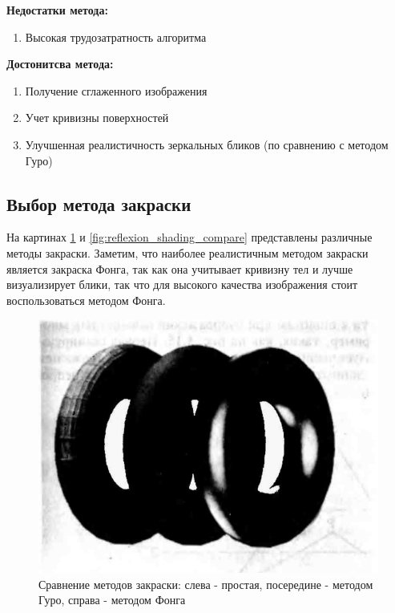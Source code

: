 \documentclass[a4paper,14pt, unknownkeysallowed]{extreport}
\begin{document}
\textbf{Недостатки метода:}
\begin{enumerate} 
	\item Высокая трудозатратность алгоритма
\end{enumerate}

\textbf{Достонитсва метода:}
\begin{enumerate}
	\item Получение сглаженного изображения
	\item Учет кривизны поверхностей
	\item Улучшенная реалистичность зеркальных бликов (по сравнению с методом Гуро)
\end{enumerate}


\subsection{Выбор метода закраски}
На картинах  \ref{fig:shading_compare} и \ref{fig:reflexion_shading_compare} представлены различные методы закраски. Заметим, что наиболее реалистичным методом закраски является
закраска Фонга, так как она учитывает кривизну тел и лучше визуализирует блики, так что для высокого качества изображения стоит воспользоваться методом Фонга.

\begin{figure}[H]
	\centering
	\includegraphics{shading_compare}
	\caption{Сравнение методов закраски: слева - простая, посередине - методом Гуро, справа - методом Фонга}
	\label{fig:shading_compare}
\end{figure}
\end{document}
